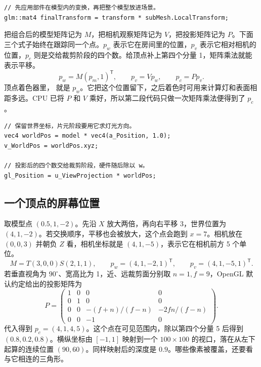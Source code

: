 \begin{lstlisting}
// 先应用部件在模型内的变换，再把整个模型放进场景。
glm::mat4 finalTransform = transform * subMesh.LocalTransform;
\end{lstlisting}

把组合后的模型矩阵记为 $M$，把相机观察矩阵记为 $V$，把投影矩阵记为 $P$。下面三个式子始终在跟踪同一个点。$p_w$ 表示它在房间里的位置，$p_v$ 表示它相对相机的位置，$p_c$ 则是交给裁剪阶段的四个数。给顶点补上第四个分量 1，矩阵乘法就能表示平移。
\[
 p_w=M(p_m,1)^{\mathsf T},\qquad p_v=Vp_w,\qquad p_c=Pp_v.
\]
顶点着色器里， 就是 $p_w$。它把这个位置留下，之后着色时可用来计算灯和表面相距多远。CPU 已将 $P$ 和 $V$ 乘好，所以第二段代码只做一次矩阵乘法便得到了 $p_c$。
\begin{lstlisting}
// 保留世界坐标，片元阶段要用它求灯光方向。
vec4 worldPos = model * vec4(a_Position, 1.0);
v_WorldPos = worldPos.xyz;

// 投影后的四个数交给裁剪阶段，硬件随后除以 w。
gl_Position = u_ViewProjection * worldPos;
\end{lstlisting}

\subsection{一个顶点的屏幕位置}
取模型点 $(0.5,1,-2)$。先沿 $X$ 放大两倍，再向右平移 3，世界位置为 $(4,1,-2)$。若交换顺序，平移也会被放大，这个点会跑到 $x=7$。相机放在 $(0,0,3)$ 并朝负 $Z$ 看，相机坐标就是 $(4,1,-5)$，表示它在相机前方 5 个单位。
\[
 M=T(3,0,0)S(2,1,1),\qquad
 p_w=(4,1,-2,1)^{\mathsf T},\qquad p_v=(4,1,-5,1)^{\mathsf T}.
\]
若垂直视角为 $90^\circ$、宽高比为 1，近、远裁剪面分别取 $n=1, f=9$，OpenGL 默认约定给出的投影矩阵为
\[
 P=\begin{pmatrix}1&0&0&0\\0&1&0&0\\
 0&0&-(f+n)/(f-n)&-2fn/(f-n)\\0&0&-1&0\end{pmatrix}.
\]
代入得到 $p_c=(4,1,4,5)$。这个点在可见范围内，除以第四个分量 5 后得到 $(0.8,0.2,0.8)$。横纵坐标由 $[-1,1]$ 映射到一个 $100\times100$ 的视口，落在从左下起算的连续位置 $(90,60)$。同样映射后的深度是 $0.9$。哪些像素被覆盖，还要看与它相连的三角形。

